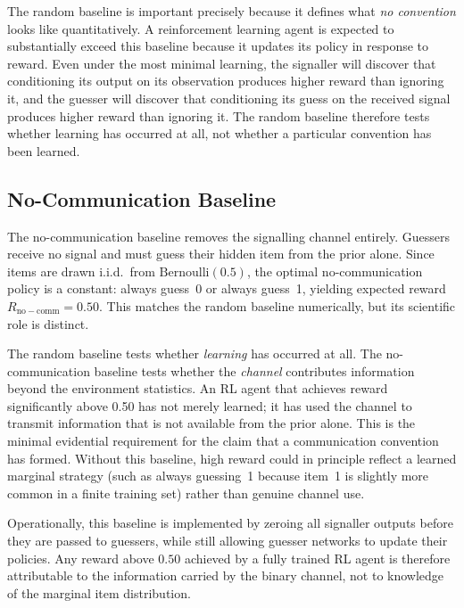 \documentclass[a4paper,twoside,12pt]{report}
\begin{document}
    The random baseline is important precisely because it defines what
    \emph{no convention} looks like quantitatively. 
    A reinforcement learning agent is expected to substantially exceed this
    baseline because it updates its policy in response to reward. Even under the
    most minimal learning, the signaller will discover that conditioning its output
    on its observation produces higher reward than ignoring it, and the guesser
    will discover that conditioning its guess on the received signal produces higher
    reward than ignoring it. The random baseline therefore tests whether learning
    has occurred at all, not whether a particular convention has been learned.
    
    \subsection{No-Communication Baseline}
    \label{sec:baseline-nocomm}
    
    The no-communication baseline removes the signalling channel entirely.
    Guessers receive no signal and must guess their hidden item from the prior
    alone. Since items are drawn i.i.d.\ from $\mathrm{Bernoulli}(0.5)$, the
    optimal no-communication policy is a constant: always guess~0 or always
    guess~1, yielding expected reward $R_{\mathrm{no-comm}} = 0.50$. This
    matches the random baseline numerically, but its scientific role is
    distinct.
    
    The random baseline tests whether \emph{learning} has occurred at all.
    The no-communication baseline tests whether the \emph{channel} contributes
    information beyond the environment statistics. An RL agent that achieves
    reward significantly above 0.50 has not merely learned; it has used the
    channel to transmit information that is not available from the prior alone.
    This is the minimal evidential requirement for the claim that a
    communication convention has formed. Without this baseline, high reward
    could in principle reflect a learned marginal strategy (such as always
    guessing~1 because item~1 is slightly more common in a finite training
    set) rather than genuine channel use.
    
    Operationally, this baseline is implemented by zeroing all signaller
    outputs before they are passed to guessers, while still allowing guesser
    networks to update their policies. Any reward above $0.50$ achieved by a
    fully trained RL agent is therefore attributable to the information carried
    by the binary channel, not to knowledge of the marginal item distribution.
    
\end{document}

